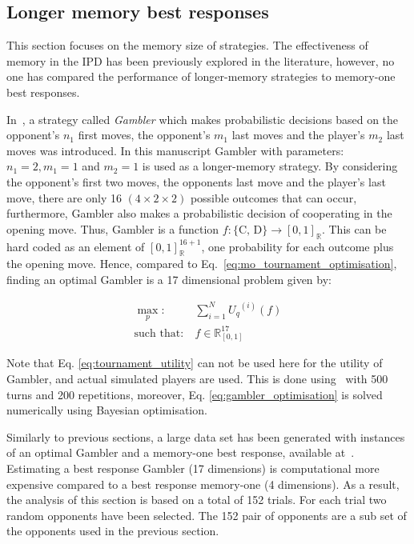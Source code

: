 \documentclass[9pt,twocolumn,twoside,lineno]{pnas-new}
\newcommand{\R}{\mathbb{R}}
\begin{document}
\subsection*{Longer memory best responses}

This section focuses on the memory size of strategies. The effectiveness of
memory in the IPD has been previously explored in the literature, however, no one
has compared the performance of longer-memory
strategies to memory-one best responses.

In~\cite{Harper2017}, a strategy called \textit{Gambler} which makes
probabilistic decisions based on the opponent's \(n_1\) first moves, the
opponent's \(m_1\) last moves and the player's \(m_2\) last moves was
introduced. In this manuscript Gambler with parameters: $n_1 = 2, m_1 = 1$ and $m_2 = 1$ is used
as a longer-memory strategy.
By considering the opponent's first two moves, the opponents last move and the
player's last move, there are only 16 $(4 \times 2 \times 2)$ possible outcomes
that can occur, furthermore, Gambler also makes a probabilistic decision of
cooperating in the opening move. Thus, Gambler is a function \(f: \{\text{C,
D}\} \rightarrow [0, 1]_{\R}\). This can be hard coded as an element
of \([0, 1]_{\R} ^ {16 + 1}\), one probability for each outcome plus the opening
move. Hence, compared to Eq.~\ref{eq:mo_tournament_optimisation}, finding an
optimal Gambler is a 17 dimensional problem given by:

\begin{equation}\label{eq:gambler_optimisation}
    \begin{aligned}
    \max_p: & \ \sum_{i=1} ^ {N} {U_q}^{(i)} (f)
    \\
    \text{such that}: & \ f \in \R_{[0, 1]}^{17}
    \end{aligned}
\end{equation}

Note that Eq. \ref{eq:tournament_utility} can not be used here for the utility
of Gambler, and actual simulated players are used. This is done using~\cite{axelrodproject}
with 500 turns and 200 repetitions, moreover, Eq. \ref{eq:gambler_optimisation}
is solved numerically using Bayesian optimisation.

Similarly to previous sections, a large data set has been generated with
instances of an optimal Gambler and a memory-one best response, available
at~\cite{glynatsi2019}. Estimating a best response Gambler (17 dimensions) is
computational more expensive compared to a best response memory-one (4
dimensions). As a result, the analysis of this section is based on a total of
152 trials. For each trial two random opponents have been selected. The 152 pair
of opponents are a sub set of the opponents used in the previous section.
\end{document}
